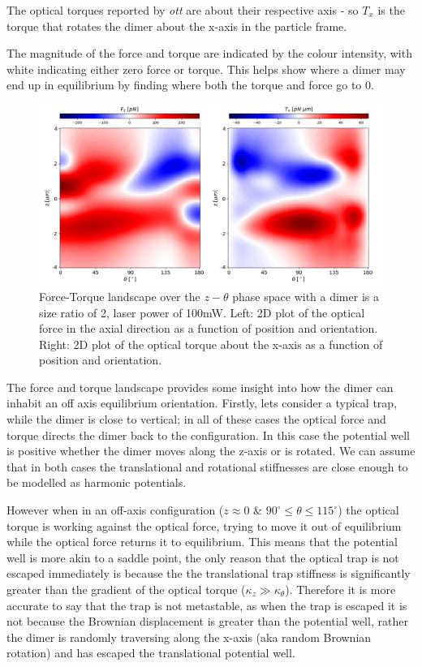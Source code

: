 The optical torques reported by \textit{ott} are
about their respective axis - so $T_x$ is the torque
that rotates the dimer about the x-axis in the particle
frame. 

The magnitude of the force and torque are indicated
by the colour intensity, with white indicating either
zero force or torque. This helps show where a
dimer may end up in equilibrium by finding 
where both the torque and force go to 0.
\begin{figure}[h!]
	\centering
	\includegraphics[width=\linewidth]{force_torque.png}
	\caption{Force-Torque landscape over the $z-\theta$ 
		phase space with a dimer is a size ratio of 2, 
		laser power of 100mW. Left: 2D plot of the 
		optical force in the axial direction as a 
		function of position and orientation. Right: 
		2D plot of the optical torque about the x-axis 
		as a function of position and orientation.}
	\label{fig:force_torque}
\end{figure}

The force and torque landscape provides some insight 
into how the dimer can inhabit an off axis equilibrium
orientation. Firstly, lets consider a typical trap, 
while the dimer is close to vertical; in all of these 
cases the optical force and torque directs the dimer 
back to the configuration. In this case the potential 
well is positive whether the dimer moves along the 
z-axis or is rotated. We can assume that in both cases
the translational and rotational stiffnesses are close
enough to be modelled as harmonic potentials.

However when in an off-axis configuration ($z\approx0$ 
\& $90^\circ\le\theta\le115^\circ$) the optical torque 
is working against the optical force, trying to move it 
out of equilibrium while the optical force returns it to 
equilibrium. This means that the potential well is more 
akin to a saddle point, the only reason that the optical
trap is not escaped immediately is because the the 
translational trap stiffness is significantly greater than
the gradient of the optical torque ($\kappa_z\gg\kappa_
\theta$). Therefore it is more accurate to say that the 
trap is not metastable, as when the trap is escaped it 
is not because the Brownian displacement is greater than
the potential well, rather the dimer is randomly 
traversing along the x-axis (aka random Brownian 
rotation) and has escaped the translational potential 
well. 

